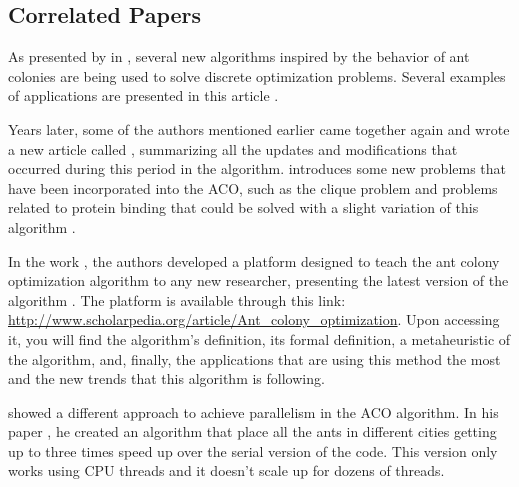 \subsection{Correlated Papers}

As presented by \citeauthor{ACO_New_Algorithm} in , several
new algorithms inspired by the behavior of ant colonies are being used
to solve discrete optimization problems. Several
examples of applications are presented in this article \cite{ACO_New_Algorithm}.

Years later, some of the authors mentioned earlier came together again and
wrote a new article called , summarizing all the updates
and modifications that occurred during this period in the algorithm. \citeauthor{UpdatesInACO} introduces
some new problems that have been incorporated into the ACO, such as the clique problem and problems
related to protein binding that could be solved with a slight variation of this algorithm
\cite{UpdatesInACO}.

In the work , the authors \citeauthor{ACO_New_Algorithm_20anos}
developed a platform designed to teach the ant colony optimization algorithm
to any new researcher, presenting the latest version of the algorithm \cite{ACO_New_Algorithm_20anos}.
The platform is available through this link: \url{http://www.scholarpedia.org/article/Ant_colony_optimization}.
Upon accessing it, you will find the algorithm's definition, its formal definition, a metaheuristic
of the algorithm, and, finally, the applications that are using this method the most and the new trends
that this algorithm is following.

 showed a different approach to achieve parallelism in the ACO algorithm.
In his paper , he created an algorithm that place all the ants in different
cities getting up to three times speed up over the serial version of the code. This version only works
using CPU threads and it doesn't scale up for dozens of threads.
